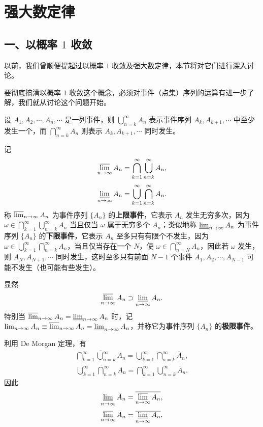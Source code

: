 \documentclass[../../main.tex]{subfiles}
\begin{document}
\section{强大数定律}\label{section:ch05-强大数定律}

\subsection*{一、以概率 $1$ 收敛}

以前，我们曾顺便提起过以概率 $1$ 收敛及强大数定律，本节将对它们进行深入讨论。

要彻底搞清以概率 $1$ 收敛这个概念，必须对事件（点集）序列的运算有进一步了解，我们就从讨论这个问题开始。

设 $A_1,A_2,\cdots,A_n,\cdots$ 是一列事件，则 $\bigcup_{n=k}^{\infty}A_n$ 表示事件序列 $A_k,A_{k+1},\cdots$ 中至少发生一个，而 $\bigcap_{n=k}^{\infty}A_n$ 则表示 $A_k,A_{k+1},\cdots$ 同时发生。

记
\begin{align}
\varlimsup_{n\to\infty}A_n=\bigcap_{k=1}^{\infty}\bigcup_{n=k}^{\infty}A_n,
\end{align}
\begin{align}
\varliminf_{n\to\infty}A_n=\bigcup_{k=1}^{\infty}\bigcap_{n=k}^{\infty}A_n.
\end{align}
称 $\varlimsup_{n\to\infty}A_n$ 为事件序列 $\{A_n\}$ 的\textbf{上限事件}，它表示 $A_n$ 发生无穷多次，因为 $\omega\in\bigcap_{k=1}^{\infty}\bigcup_{n=k}^{\infty}A_n$ 当且仅当 $\omega$ 属于无穷多个 $A_n$；类似地称 $\varliminf_{n\to\infty}A_n$ 为事件序列 $\{A_n\}$ 的\textbf{下限事件}，它表示 $A_n$ 至多只有有限个不发生，因为 $\omega\in\bigcup_{k=1}^{\infty}\bigcap_{n=k}^{\infty}A_n$，当且仅当存在一个 $N$，使 $\omega\in\bigcap_{n=N}^{\infty}A_n$，因此若 $\omega$ 发生，则 $A_N,A_{N+1},\cdots$ 同时发生，这时至多只有前面 $N-1$ 个事件 $A_1,A_2,\cdots,A_{N-1}$ 可能不发生（也可能有些发生）。

显然
\begin{align}
\varlimsup_{n\to\infty}A_n\supset\varliminf_{n\to\infty}A_n.
\end{align}
特别当 $\varlimsup_{n\to\infty}A_n=\varliminf_{n\to\infty}A_n$ 时，记 $\lim_{n\to\infty}A_n\equiv\varlimsup_{n\to\infty}A_n=\varliminf_{n\to\infty}A_n$，并称它为事件序列 $\{A_n\}$ 的\textbf{极限事件}。

利用 De Morgan 定理，有
\begin{align*}
\overline{\bigcap_{k=1}^{\infty}\bigcup_{n=k}^{\infty}A_n}=\bigcup_{k=1}^{\infty}\bigcap_{n=k}^{\infty}\bar{A}_n,
\end{align*}
\begin{align*}
\overline{\bigcup_{k=1}^{\infty}\bigcap_{n=k}^{\infty}A_n}=\bigcap_{k=1}^{\infty}\bigcup_{n=k}^{\infty}\bar{A}_n.
\end{align*}
因此
\begin{align}
\varliminf_{n\to\infty}\bar{A}_n=\overline{\varlimsup_{n\to\infty}A_n},
\end{align}
\begin{align}
\varlimsup_{n\to\infty}\bar{A}_n=\overline{\varliminf_{n\to\infty}A_n}.
\end{align}
\end{document}
